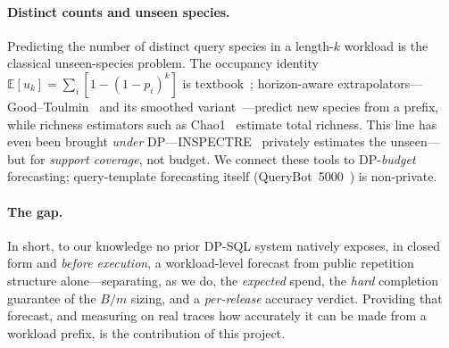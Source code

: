 \documentclass[sigconf,nonacm]{acmart}
\newcommand{\E}{\mathbb{E}}
\begin{document}
\paragraph{Distinct counts and unseen species.}
Predicting the number of distinct query species in a length-$k$ workload is the classical unseen-species problem. The occupancy identity $\E[u_k]=\sum_i[1-(1-p_i)^k]$ is textbook~\cite{flajolet1992}; horizon-aware extrapolators---Good--Toulmin~\cite{goodtoulmin1956} and its smoothed variant~\cite{orlitsky2016unseen}---predict new species from a prefix, while richness estimators such as Chao1~\cite{chao1984} estimate total richness. This line has even been brought \emph{under} DP---INSPECTRE~\cite{acharya2018inspectre} privately estimates the unseen---but for \emph{support coverage}, not budget. We connect these tools to DP-\emph{budget} forecasting; query-template forecasting itself (QueryBot~5000~\cite{ma2018qb5000}) is non-private.

\begin{table}[t]
\footnotesize\centering
\caption{Positioning. To our knowledge, no prior system natively exposes a closed-form, before-execution budget forecast from public workload structure alone.}
\label{tab:related}
\setlength{\tabcolsep}{4pt}
\end{table}

\paragraph{The gap.}
In short, to our knowledge no prior DP-SQL system natively exposes, in closed form and \emph{before execution}, a workload-level forecast from public repetition structure alone---separating, as we do, the \emph{expected} spend, the \emph{hard} completion guarantee of the $B/m$ sizing, and a \emph{per-release} accuracy verdict. Providing that forecast, and measuring on real traces how accurately it can be made from a workload prefix, is the contribution of this project.
\end{document}
